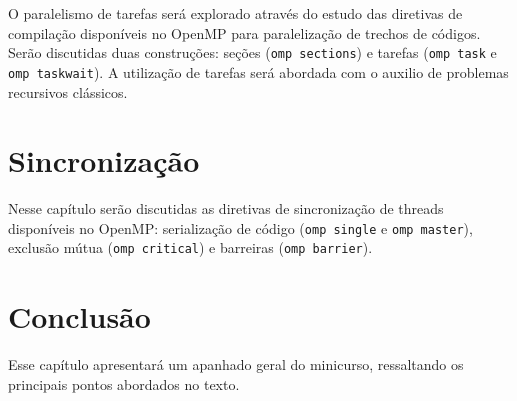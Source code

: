 \documentclass{SBCbookchapter}
\begin{document}
	O paralelismo de tarefas será explorado através do estudo das diretivas
	de compilação disponíveis no OpenMP para paralelização de trechos de
	códigos. Serão discutidas duas construções: seções (\texttt{omp
	sections}) e tarefas (\texttt{omp task} e \texttt{omp taskwait}). A
	utilização de tarefas será abordada com o auxilio de problemas
	recursivos clássicos.

\section{Sincronização}
\label{section: sincronizacao}

	Nesse capítulo serão discutidas as diretivas de sincronização de threads
	disponíveis no OpenMP: serialização de código (\texttt{omp single} e
	\texttt{omp master}), exclusão mútua (\texttt{omp critical}) e barreiras
	(\texttt{omp barrier}).

\section{Conclusão}

	Esse capítulo apresentará um apanhado geral do minicurso, ressaltando os
	principais pontos abordados no texto.


\end{document}
